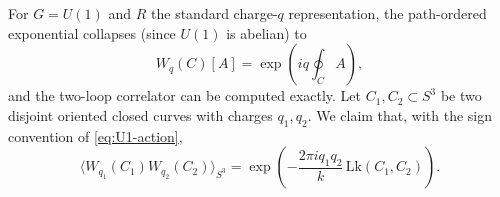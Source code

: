 \documentclass[11pt]{article}
\theoremstyle{definition}
\numberwithin{theorem}{section}
\numberwithin{equation}{section}
\begin{document}
\begin{example}\label{ex:abelian-wilson}
For $G = U(1)$ and $R$ the standard charge-$q$ representation, the path-ordered exponential collapses (since $U(1)$ is abelian) to
\begin{equation*}
W_q(C)[A] = \exp\left(iq\oint_C A\right),
\end{equation*}
and the two-loop correlator can be computed exactly. Let $C_1,C_2\subset S^3$ be two disjoint oriented closed curves with charges $q_1,q_2$. We claim that, with the sign convention of \eqref{eq:U1-action},
\begin{equation*}
\langle W_{q_1}(C_1)W_{q_2}(C_2)\rangle_{S^3}
=
\exp\left(-\frac{2\pi i q_1 q_2}{k}\,\mathrm{Lk}(C_1,C_2)\right).
\end{equation*}


\end{example}
\end{document}
